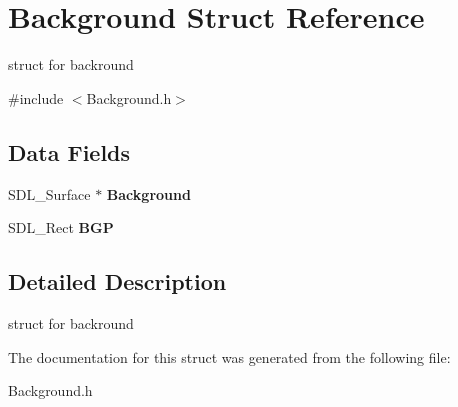 \hypertarget{structBackground}{}\section{Background Struct Reference}
\label{structBackground}


struct for backround  




{\ttfamily \#include $<$Background.\+h$>$}

\subsection*{Data Fields}
\begin{DoxyCompactItemize}
\item 
\mbox{\label{structBackground_a48447361bd7526e1a7f9703afd11c484}} 
S\+D\+L\+\_\+\+Surface $\ast$ {\bfseries Background}
\item 
\mbox{\label{structBackground_a100727355caec627b59cb5155ea9fcc1}} 
S\+D\+L\+\_\+\+Rect {\bfseries B\+GP}
\end{DoxyCompactItemize}


\subsection{Detailed Description}
struct for backround 

The documentation for this struct was generated from the following file\+:\begin{DoxyCompactItemize}
\item 
Background.\+h\end{DoxyCompactItemize}
